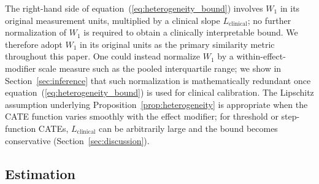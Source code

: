 \documentclass[AMA,Times1COL]{WileyNJDv5}
\begin{document}
The right-hand side of equation~(\ref{eq:heterogeneity_bound}) involves $W_1$ in its original measurement units, multiplied by a clinical slope $L_{\text{clinical}}$; no further normalization of $W_1$ is required to obtain a clinically interpretable bound. We therefore adopt $W_1$ in its original units as the primary similarity metric throughout this paper. One could instead normalize $W_1$ by a within-effect-modifier scale measure such as the pooled interquartile range; we show in Section~\ref{sec:inference} that such normalization is mathematically redundant once equation~(\ref{eq:heterogeneity_bound}) is used for clinical calibration. The Lipschitz assumption underlying Proposition~\ref{prop:heterogeneity} is appropriate when the CATE function varies smoothly with the effect modifier; for threshold or step-function CATEs, $L_{\text{clinical}}$ can be arbitrarily large and the bound becomes conservative (Section~\ref{sec:discussion}).

\subsection{Estimation}\label{sec:estimation}
\end{document}
